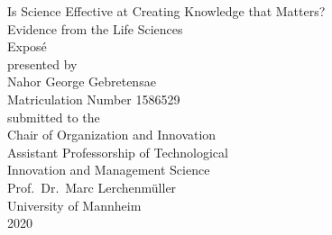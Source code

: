 \documentclass{article}
\begin{document}
\begin{titlepage}
	\vspace*{2cm}
  \begin{center}
   {\Large Is Science Effective at Creating Knowledge that Matters?\\
	\small Evidence from the Life Sciences\\}
   \vspace{2cm} 
   {Exposé\\}
   \vspace{2cm}
   {presented by\\
    Nahor George Gebretensae\\
		Matriculation Number 1586529\\
   }
   \vspace{1cm} 
   {submitted to the\\
    Chair of Organization and Innovation\\
		Assistant Professorship of Technological\\
		Innovation and Management Science\\
    Prof.\ Dr.\ Marc Lerchenmüller\\
    University of Mannheim\\} \vspace{2cm}
   {2020}
  \end{center}
\end{titlepage}

\newpage
\tableofcontents
\newpage
\listoftables
\newpage
\end{document}
